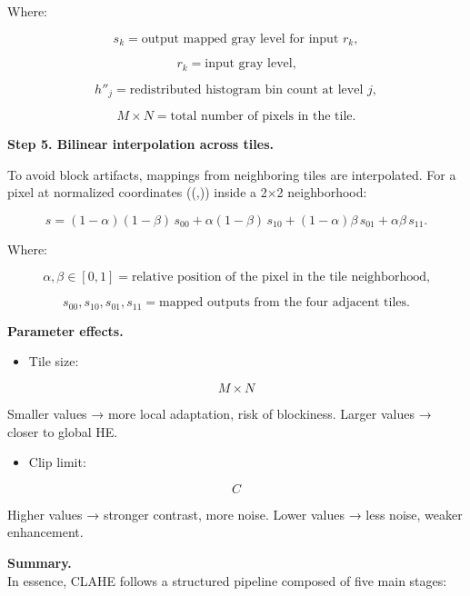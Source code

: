 \documentclass[11pt]{article}
\providecommand{\tightlist}{%
      \setlength{\itemsep}{0pt}\setlength{\parskip}{0pt}}
\begin{document}
Where:

\[
s_k = \text{output mapped gray level for input } r_k,
\]

\[
r_k = \text{input gray level,}
\]

\[
h''_j = \text{redistributed histogram bin count at level } j,
\]

\[
M \times N = \text{total number of pixels in the tile.}
\]

\textbf{Step 5. Bilinear interpolation across tiles.}

To avoid block artifacts, mappings from neighboring tiles are
interpolated. For a pixel at normalized coordinates ((\alpha,\beta))
inside a 2×2 neighborhood:

\[
s = (1-\alpha)(1-\beta)\,s_{00} + \alpha(1-\beta)\,s_{10} + (1-\alpha)\beta\,s_{01} + \alpha\beta\,s_{11}.
\]

Where:

\[
\alpha, \beta \in [0,1] = \text{relative position of the pixel in the tile neighborhood,}
\]

\[
s_{00}, s_{10}, s_{01}, s_{11} = \text{mapped outputs from the four adjacent tiles.}
\]

\textbf{Parameter effects.}

\begin{itemize}
\tightlist
\item
  Tile size:
\end{itemize}

\[
M \times N
\]

Smaller values → more local adaptation, risk of blockiness. Larger
values → closer to global HE.

\begin{itemize}
\tightlist
\item
  Clip limit:
\end{itemize}

\[
C
\]

Higher values → stronger contrast, more noise. Lower values → less
noise, weaker enhancement.

\textbf{Summary.}\\
In essence, CLAHE follows a structured pipeline composed of five main
stages:
\end{document}
